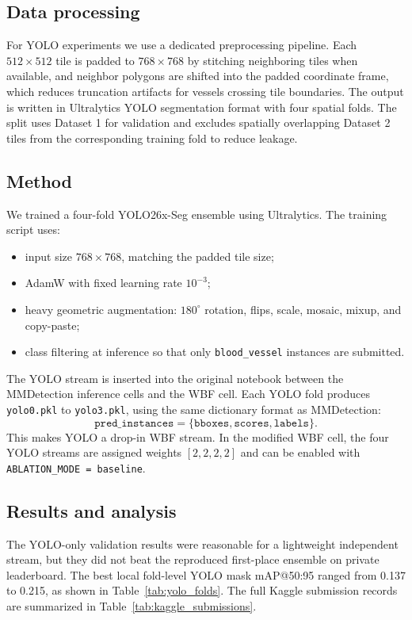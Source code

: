 \documentclass[12pt, a4paper]{article}
\begin{document}
\subsection{Data processing}

For YOLO experiments we use a dedicated preprocessing pipeline. Each $512 \times 512$ tile is padded to $768 \times 768$ by stitching neighboring tiles when available, and neighbor polygons are shifted into the padded coordinate frame, which reduces truncation artifacts for vessels crossing tile boundaries. The output is written in Ultralytics YOLO segmentation format with four spatial folds. The split uses Dataset 1 for validation and excludes spatially overlapping Dataset 2 tiles from the corresponding training fold to reduce leakage.

\subsection{Method}

We trained a four-fold YOLO26x-Seg ensemble using Ultralytics. The training script uses:
\begin{itemize}
    \item input size $768 \times 768$, matching the padded tile size;
    \item AdamW with fixed learning rate $10^{-3}$;
    \item heavy geometric augmentation: $180^\circ$ rotation, flips, scale, mosaic, mixup, and copy-paste;
    \item class filtering at inference so that only \texttt{blood\_vessel} instances are submitted.
\end{itemize}

The YOLO stream is inserted into the original notebook between the MMDetection inference cells and the WBF cell. Each YOLO fold produces \texttt{yolo0.pkl} to \texttt{yolo3.pkl}, using the same dictionary format as MMDetection:
\[
\texttt{pred\_instances} = \{\texttt{bboxes}, \texttt{scores}, \texttt{labels}\}.
\]
This makes YOLO a drop-in WBF stream. In the modified WBF cell, the four YOLO streams are assigned weights \([2,2,2,2]\) and can be enabled with \texttt{ABLATION\_MODE = baseline}.

\subsection{Results and analysis}

The YOLO-only validation results were reasonable for a lightweight independent stream, but they did not beat the reproduced first-place ensemble on private leaderboard. The best local fold-level YOLO mask mAP@50:95 ranged from 0.137 to 0.215, as shown in Table~\ref{tab:yolo_folds}. The full Kaggle submission records are summarized in Table~\ref{tab:kaggle_submissions}.
\end{document}
